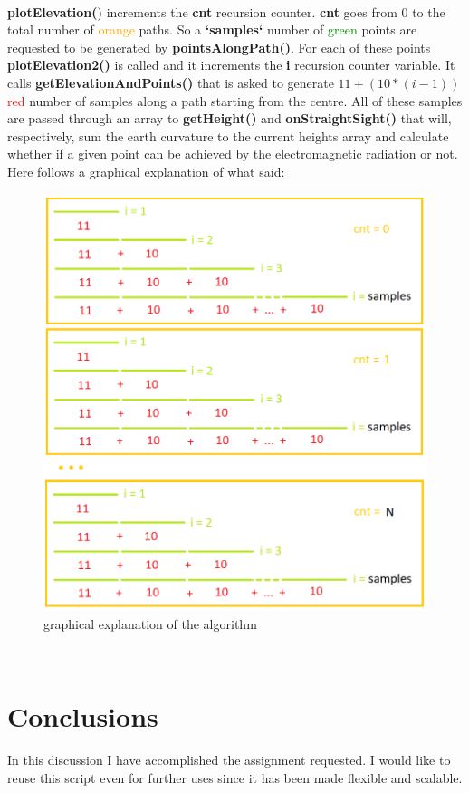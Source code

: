 \documentclass[peerreview]{IEEEtran}
\begin{document}
\\\textbf{plotElevation(}) increments the \textbf{cnt} recursion counter. \textbf{cnt} goes from 0 to the total number of \textcolor{orange}{orange} paths. So a \textbf{‘samples‘} number of \textcolor{green}{green} points are requested to be generated by \textbf{pointsAlongPath()}. For each of these points \textbf{plotElevation2()} is called and it increments the \textbf{i} recursion counter variable. It calls \textbf{getElevationAndPoints()} that is asked to generate $11+(10*(i-1))$ \textcolor{red}{red} number of samples along a path starting from the centre. All of these samples are passed through an array to \textbf{getHeight()} and  \textbf{onStraightSight()} that will, respectively, sum the earth curvature to the current heights array and calculate whether if a given point can be achieved by the electromagnetic radiation or not.
\pagebreak
\\Here follows a graphical explanation of what said:
\begin{figure}[!ht]
\centering
\includegraphics[width=1\columnwidth]{algorithm} 
\caption{graphical explanation of the algorithm}
\label{fig_algorithm}
\end{figure}\\
\section{Conclusions}
In this discussion I have accomplished the assignment requested. I would like to reuse this script even for further uses since it has been made flexible and scalable.
\end{document}

